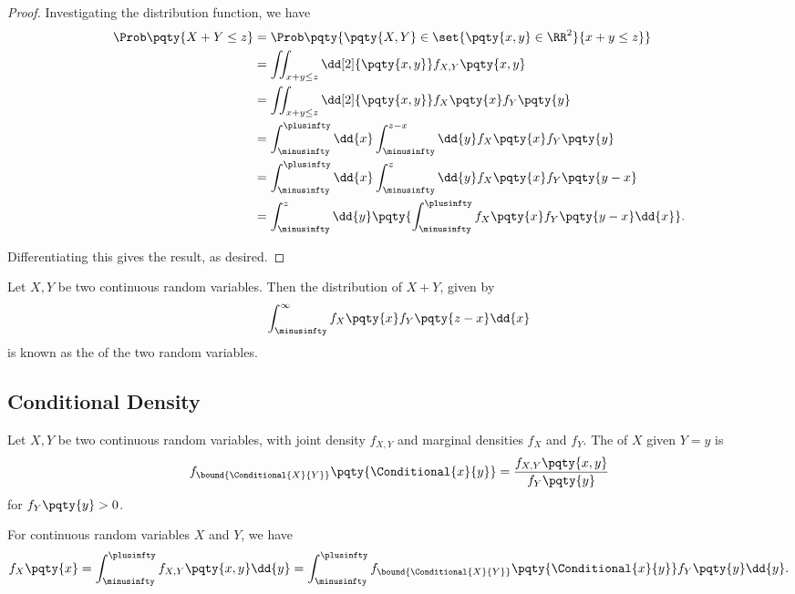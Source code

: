 \begin{proof}
    Investigating the distribution function, we have
    \begin{align*}
        \Prob\pqty{X + Y \leq z} &= \Prob\pqty{\pqty{X, Y} \in \set{\pqty{x, y} \in \RR^2}{x + y \leq z}} \\
        &= \iint_{x + y \leq z} \dd[2]{\pqty{x, y}} f_{X, Y} \pqty{x, y} \\
        &= \iint_{x + y \leq z} \dd[2]{\pqty{x, y}} f_{X} \pqty{x} f_{Y} \pqty{y} \\
        &= \int_{\minusinfty}^{\plusinfty} \dd{x} \int_{\minusinfty}^{z - x} \dd{y} f_X\pqty{x} f_Y\pqty{y} \\
        &= \int_{\minusinfty}^{\plusinfty} \dd{x} \int_{\minusinfty}^{z} \dd{y} f_X\pqty{x} f_Y\pqty{y - x} \\
        &= \int_{\minusinfty}^{z} \dd{y} \pqty{\int_{\minusinfty}^{\plusinfty} f_X\pqty{x} f_Y\pqty{y - x} \dd{x}}.
    \end{align*}

    Differentiating this gives the result, as desired.
\end{proof}

\begin{definition}
    \label{def:convolution-crv}%
    Let \(X, Y\) be two continuous random variables. Then the distribution of \(X + Y\), given by
    \[
        \int_{\minusinfty}^{\infty} f_X\pqty{x} f_Y\pqty{z - x} \dd{x}
    \]
    is known as the  of the two random variables.
\end{definition}

\subsection{Conditional Density}

\begin{definition}
    \label{def:conditional-density}%
    Let \(X, Y\) be two continuous random variables, with joint density \(f_{X, Y}\) and marginal densities \(f_{X}\) and \(f_{Y}\). The  of \(X\) given \(Y = y\) is
    \[
        f_{\bound{\Conditional{X}{Y}}} \pqty{\Conditional{x}{y}} = \frac{f_{X, Y}\pqty{x, y}}{f_Y\pqty{y}}
    \]
    for \(f_Y\pqty{y} > 0\).
\end{definition}

\begin{theorem}
    \label{thm:cont-law-total-prob}%
    For continuous random variables \(X\) and \(Y\), we have
    \[
        f_X\pqty{x} = \int_{\minusinfty}^{\plusinfty} f_{X, Y} \pqty{x, y} \dd{y} = \int_{\minusinfty}^{\plusinfty} f_{\bound{\Conditional{X}{Y}}} \pqty{\Conditional{x}{y}} f_Y\pqty{y} \dd{y}.
    \]
\end{theorem}

